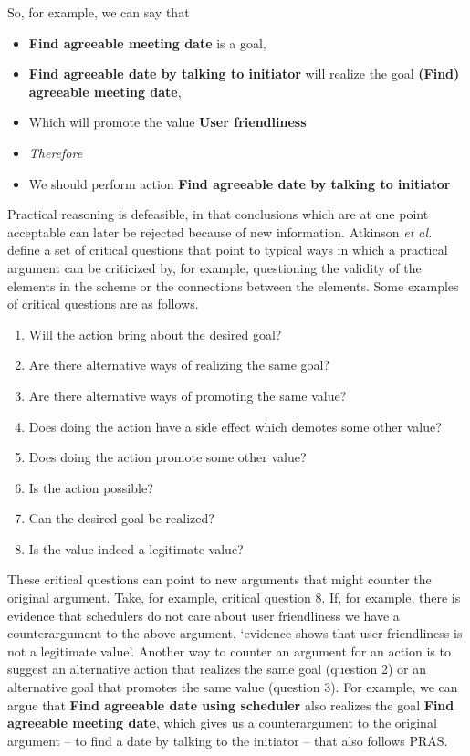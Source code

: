 \documentclass[11.5pt,two column]{llncs}
\begin{document}
So, for example, we can say that 
\begin{itemize}
\item[] \textbf{Find agreeable meeting date} is a goal,
\item[] \textbf{Find agreeable date by talking to initiator} will realize the goal \textbf{(Find) agreeable meeting date},
\item[] Which will promote the value \textbf{User friendliness}
\item[] \textit{Therefore} 
\item[] We should perform action \textbf{Find agreeable date by talking to initiator}
\end{itemize}

Practical reasoning is defeasible, in that conclusions which are at one point acceptable can later be rejected because of new information. Atkinson \emph{et al.}~\cite{atkinson2007} define a set of critical questions that point to typical ways in which a practical argument can be criticized by, for example, questioning the validity of the elements in the scheme or the connections between the elements. Some examples of critical questions are as follows.

\begin{enumerate}
\item Will the action bring about the desired goal?
\item Are there alternative ways of realizing the same goal?
\item Are there alternative ways of promoting the same value?
\item Does doing the action have a side effect which demotes some other value?
\item Does doing the action promote some other value?
\item Is the action possible?
\item Can the desired goal be realized?
\item Is the value indeed a legitimate value?
\end{enumerate}

These critical questions can point to new arguments that might counter the original argument. Take, for example, critical question 8. If, for example, there is evidence that schedulers do not care about user friendliness we have a counterargument to the above argument, `evidence shows that \textsf{user friendliness} is not a legitimate value'. Another way to counter an argument for an action is to suggest an alternative action that realizes the same goal (question 2) or an alternative goal that promotes the same value (question 3). For example, we can argue that \textbf{Find agreeable date using scheduler} also realizes the goal \textbf{Find agreeable meeting date}, which gives us a counterargument to the original argument -- to find a date by talking to the initiator -- that also follows PRAS. 
\end{document}
